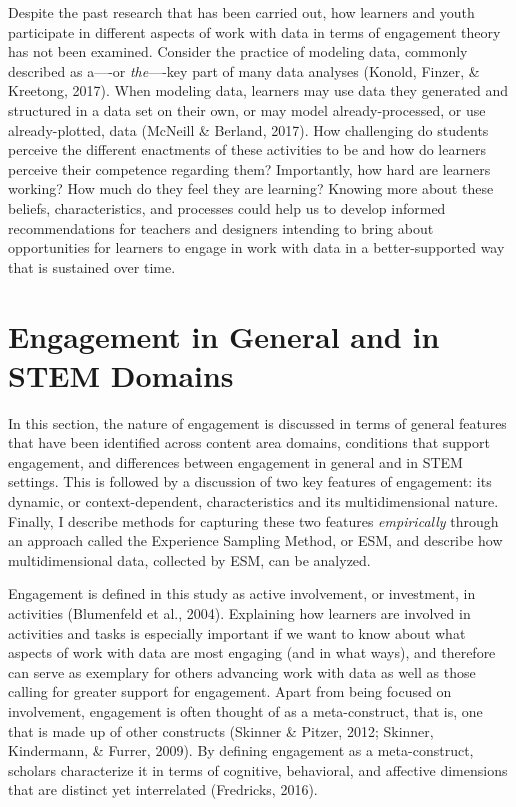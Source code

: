 \documentclass[]{msu-thesis}
\theoremstyle{definition}
\theoremstyle{definition}
\theoremstyle{definition}
\theoremstyle{remark}
\begin{document}
Despite the past research that has been carried out, how learners and
youth participate in different aspects of work with data in terms of
engagement theory has not been examined. Consider the practice of
modeling data, commonly described as a----or \emph{the}----key part of
many data analyses (Konold, Finzer, \& Kreetong, 2017). When modeling
data, learners may use data they generated and structured in a data set
on their own, or may model already-processed, or use already-plotted,
data (McNeill \& Berland, 2017). How challenging do students perceive
the different enactments of these activities to be and how do learners
perceive their competence regarding them? Importantly, how hard are
learners working? How much do they feel they are learning? Knowing more
about these beliefs, characteristics, and processes could help us to
develop informed recommendations for teachers and designers intending to
bring about opportunities for learners to engage in work with data in a
better-supported way that is sustained over time.

\section{Engagement in General and in STEM
Domains}\label{engagement-in-general-and-in-stem-domains}

In this section, the nature of engagement is discussed in terms of
general features that have been identified across content area domains,
conditions that support engagement, and differences between engagement
in general and in STEM settings. This is followed by a discussion of two
key features of engagement: its dynamic, or context-dependent,
characteristics and its multidimensional nature. Finally, I describe
methods for capturing these two features \emph{empirically} through an
approach called the Experience Sampling Method, or ESM, and describe how
multidimensional data, collected by ESM, can be analyzed.

Engagement is defined in this study as active involvement, or
investment, in activities (Blumenfeld et al., 2004). Explaining how
learners are involved in activities and tasks is especially important if
we want to know about what aspects of work with data are most engaging
(and in what ways), and therefore can serve as exemplary for others
advancing work with data as well as those calling for greater support
for engagement. Apart from being focused on involvement, engagement is
often thought of as a meta-construct, that is, one that is made up of
other constructs (Skinner \& Pitzer, 2012; Skinner, Kindermann, \&
Furrer, 2009). By defining engagement as a meta-construct, scholars
characterize it in terms of cognitive, behavioral, and affective
dimensions that are distinct yet interrelated (Fredricks, 2016).
\end{document}
